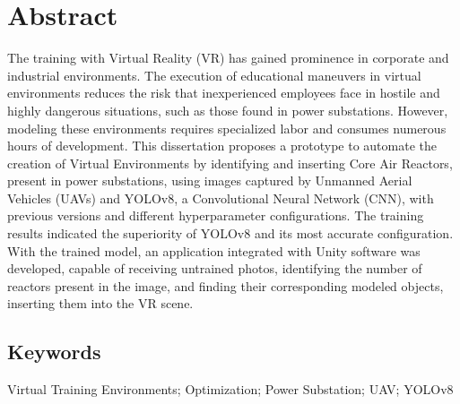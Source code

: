 \newpage
\thispagestyle{empty}
\chapter*{Abstract}
\vspace{-35pt}

The training with Virtual Reality (VR) has gained prominence in corporate and industrial environments. The execution of educational maneuvers in virtual environments reduces the risk that inexperienced employees face in hostile and highly dangerous situations, such as those found in power substations. However, modeling these environments requires specialized labor and consumes numerous hours of development. This dissertation proposes a prototype to automate the creation of Virtual Environments by identifying and inserting Core Air Reactors, present in power substations, using images captured by Unmanned Aerial Vehicles (UAVs) and YOLOv8, a Convolutional Neural Network (CNN), with previous versions and different hyperparameter configurations. The training results indicated the superiority of YOLOv8 and its most accurate configuration. With the trained model, an application integrated with Unity software was developed, capable of receiving untrained photos, identifying the number of reactors present in the image, and finding their corresponding modeled objects, inserting them into the VR scene.

\section*{Keywords}
Virtual Training Environments; Optimization; Power Substation; UAV; YOLOv8